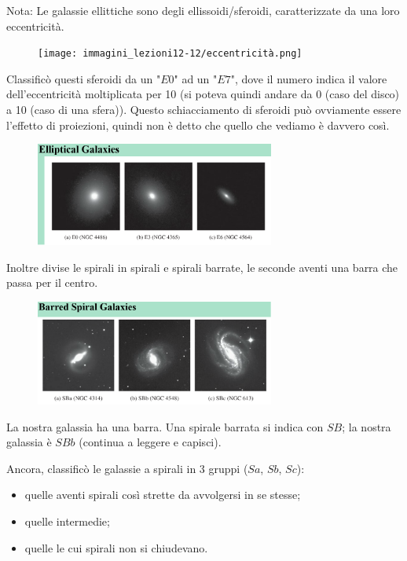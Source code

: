 Nota: Le galassie ellittiche sono degli ellissoidi/sferoidi, caratterizzate da una loro eccentricità.

\begin{figure}[H]
    \centering
    \texttt{[image: immagini\_lezioni12-12/eccentricità.png]}
\end{figure}

Classificò questi sferoidi da un "$E0$" ad un "$E7$", dove il numero indica il valore dell'eccentricità moltiplicata per 10 (si poteva quindi andare da 0 (caso del disco) a 10 (caso di una sfera)). Questo schiacciamento di sferoidi può ovviamente essere l'effetto di proiezioni, quindi non è detto che quello che vediamo è davvero così.

\begin{figure}[H]
    \centering
    \includegraphics[width=0.7\textwidth]{immagini_lezioni12-12/galassie ellittiche.png}
\end{figure}

Inoltre divise le spirali in spirali e spirali barrate, le seconde aventi una barra che passa per il centro.

\begin{figure}[H]
    \centering
    \includegraphics[width=0.7\textwidth]{immagini_lezioni12-12/galassie a spirali barrate.png}
\end{figure}

La nostra galassia ha una barra. Una spirale barrata si indica con $SB$; la nostra galassia è $SBb$ (continua a leggere e capisci).

Ancora, classificò le galassie a spirali in 3 gruppi ($Sa$, $Sb$, $Sc$):

\begin{itemize}
    \item quelle aventi spirali così strette da avvolgersi in se stesse;
    \item quelle intermedie;
    \item quelle le cui spirali non si chiudevano.
\end{itemize}

